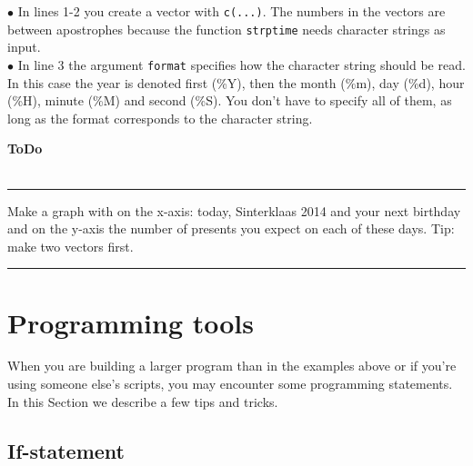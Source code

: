\documentclass[a4paper,11pt,twocolumn,tablecaptionabove]{scrartcl} %
\newenvironment{ToDo} {%
  \begin{flushright}
    \hfill
    \begin{minipage}{0.95\columnwidth}         %
    \textsf{\textbf{ToDo}} \\
      \vspace{-0.85cm}\\
      {\color{Gray}\rule[-0.1cm]{\columnwidth}{1.5pt}}} { %
      {\color{Gray} \rule[0.3cm]{\columnwidth}{1.5pt}}
    \end{minipage}
    \vspace{1em}
  \end{flushright}
  }
\begin{document}
\noindent $\bullet$  In lines 1-2 you create a vector with \texttt{c(...)}. The numbers in the vectors are between apostrophes because the function \texttt{strptime} needs character strings as input.\\
\noindent $\bullet$ In line 3 the argument \texttt{format} specifies how the character string should be read. In this case the year is denoted first (\%Y), then the month (\%m), day (\%d), hour (\%H), minute (\%M) and second (\%S). You don't have to specify all of them, as long as the format corresponds to the character string.

\begin{ToDo}
Make a graph with on the x-axis: today, Sinterklaas 2014 and your next birthday and on the y-axis the number of presents you expect on each of these days. Tip: make two vectors first.
\end{ToDo}





\section{Programming tools}

When you are building a larger program than in the examples above or if you're using someone else's scripts, you may encounter some programming statements. In this Section we describe a few tips and tricks.

\subsection{If-statement}
\end{document}
